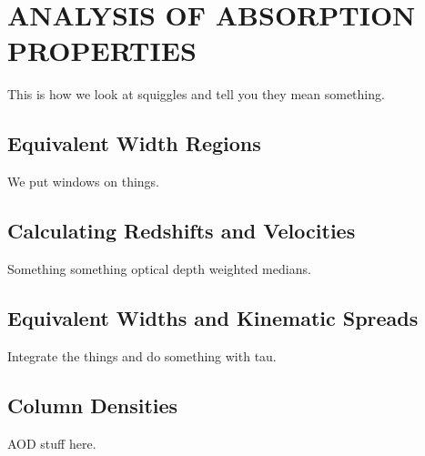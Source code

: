 \section{\MakeUppercase{Analysis of Absorption Properties}}
\label{ch4}

This is how we look at squiggles and tell you they mean something.

\subsection{Equivalent Width Regions}
\label{ch4:regions}

We put windows on things.

\subsection{Calculating Redshifts and Velocities}
\label{ch4:redshift}

Something something optical depth weighted medians.

\subsection{Equivalent Widths and Kinematic Spreads}
\label{ch4:ew}

Integrate the things and do something with tau.

\subsection{Column Densities}
\label{ch4:column}

AOD stuff here.
